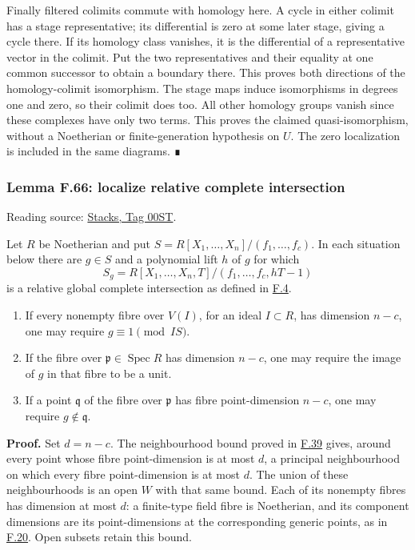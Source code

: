 \documentclass[11pt,a4paper,openany]{report}
\newcounter{none}
\providecommand{\tightlist}{\setlength{\itemsep}{0pt}\setlength{\parskip}{0pt}}
\begin{document}
Finally filtered colimits commute with homology here. A cycle in either colimit has a stage representative; its differential is zero at some later stage, giving a cycle there. If its homology class vanishes, it is the differential of a representative vector in the colimit. Put the two representatives and their equality at one common successor to obtain a boundary there. This proves both directions of the homology-colimit isomorphism. The stage maps induce isomorphisms in degrees one and zero, so their colimit does too. All other homology groups vanish since these complexes have only two terms. This proves the claimed quasi-isomorphism, without a Noetherian or finite-generation hypothesis on \(U\). The zero localization is included in the same diagrams. ∎

\label{AG-RG-S05-algebra-lemma-localize-relative-complete-intersection}

\subsubsection{Lemma F.66: localize relative complete intersection}\label{AG-RG-S05-lemma-f.66-localize-relative-complete-intersection}

Reading source: \href{https://stacks.math.columbia.edu/tag/00ST}{Stacks, Tag 00ST}.

Let \(R\) be Noetherian and put \(S=R[X_1,\ldots,X_n]/(f_1,\ldots,f_c)\). In each situation below there are \(g\in S\) and a polynomial lift \(h\) of \(g\) for which \[S_g=R[X_1,\ldots,X_n,T]/(f_1,\ldots,f_c,hT-1)\] is a relative global complete intersection as defined in \hyperref[AG-RG-S05-algebra-definition-relative-global-complete-intersection]{F.4}.

\begin{enumerate}
\def\labelenumi{\arabic{enumi}.}
\tightlist
\item
  If every nonempty fibre over \(V(I)\), for an ideal \(I\subset R\), has dimension \(n-c\), one may require \(g\equiv1\pmod{IS}\).
\item
  If the fibre over \(\mathfrak p\in\operatorname{Spec}R\) has dimension \(n-c\), one may require the image of \(g\) in that fibre to be a unit.
\item
  If a point \(\mathfrak q\) of the fibre over \(\mathfrak p\) has fibre point-dimension \(n-c\), one may require \(g\notin\mathfrak q\).
\end{enumerate}

\textbf{Proof.} Set \(d=n-c\). The neighbourhood bound proved in \hyperref[AG-RG-S05-algebra-lemma-dimension-fibres-bounded-open-upstairs]{F.39} gives, around every point whose fibre point-dimension is at most \(d\), a principal neighbourhood on which every fibre point-dimension is at most \(d\). The union of these neighbourhoods is an open \(W\) with that same bound. Each of its nonempty fibres has dimension at most \(d\): a finite-type field fibre is Noetherian, and its component dimensions are its point-dimensions at the corresponding generic points, as in \hyperref[AG-RG-S05-algebra-lemma-codimension]{F.20}. Open subsets retain this bound.
\end{document}
